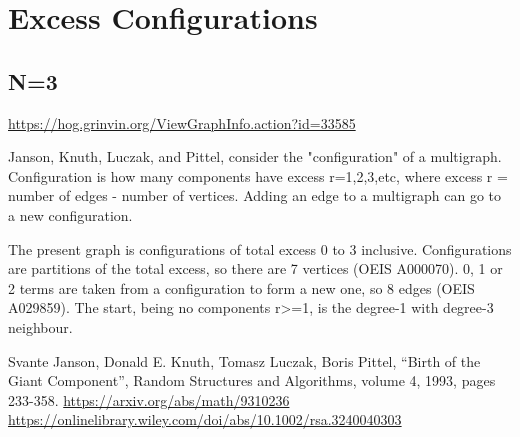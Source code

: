 \documentclass{article}
\begin{document}
\section{Excess Configurations}

\subsection{N=3}
\url{https://hog.grinvin.org/ViewGraphInfo.action?id=33585}

Janson, Knuth, Luczak, and Pittel, consider the "configuration" of a
multigraph.  Configuration is how many components have excess
r=1,2,3,etc, where excess r = number of edges - number of vertices.
Adding an edge to a multigraph can go to a new configuration.

The present graph is configurations of total excess 0 to 3 inclusive.
Configurations are partitions of the total excess, so there are 7
vertices (OEIS A000070).  0, 1 or 2 terms are taken from a
configuration to form a new one, so 8 edges (OEIS A029859).  The
start, being no components r>=1, is the degree-1 with degree-3
neighbour.

Svante Janson, Donald E. Knuth, Tomasz Luczak, Boris Pittel, ``Birth
of the Giant Component'', Random Structures and Algorithms, volume 4,
1993, pages 233-358.
\newline
\url{https://arxiv.org/abs/math/9310236}
\newline
\url{https://onlinelibrary.wiley.com/doi/abs/10.1002/rsa.3240040303}

\begin{center}
\end{center}
\end{document}
